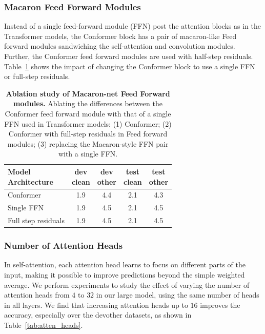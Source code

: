 \subsubsection{Macaron Feed Forward Modules}
\label{ablate_conformer_macaron}
Instead of a single feed-forward module (FFN) post the attention blocks as in the Transformer models, the Conformer block has a pair of macaron-like Feed forward modules sandwiching the self-attention and convolution modules. Further, the Conformer feed forward modules are used with half-step residuals.
Table~\ref{tab:ablation_macaron} shows the impact of changing the Conformer block to use a single FFN or full-step residuals.
%
\begin{table}[h]
\begin{centering}
\caption{\textbf{Ablation study of Macaron-net Feed Forward modules.}
Ablating the differences between the Conformer feed forward module with that of a single FFN used in Transformer models: (1) Conformer; (2) Conformer with full-step residuals in Feed forward modules; (3) replacing the Macaron-style FFN pair with a single FFN.
}
\label{tab:ablation_macaron}
\begin{tabular}{l|cccc}
\hline 
\makecell{Model\\ Architecture} & \makecell{dev\\ clean} & \makecell{dev\\ other} & \makecell{test\\ clean} & \makecell{test\\ other} \\
\hline 
\hline 
Conformer & 1.9 & 4.4 & 2.1 & 4.3 \tabularnewline
Single FFN & 1.9 & 4.5 & 2.1 & 4.5 \tabularnewline
Full step residuals & 1.9 & 4.5 & 2.1 & 4.5 \tabularnewline
\hline 
\end{tabular}
\par\end{centering}

\end{table}

\subsubsection{Number of Attention Heads}

In self-attention, each attention head learns to focus on different parts of the input, making it possible to improve predictions beyond the simple weighted average. We perform experiments to study the effect of varying the number of attention heads from $4$ to $32$ in our large model, using the same number of heads in all layers. We find that increasing attention heads up to $16$ improves the accuracy, especially over the devother datasets, as shown in Table~\ref{tab:atten_heads}.

